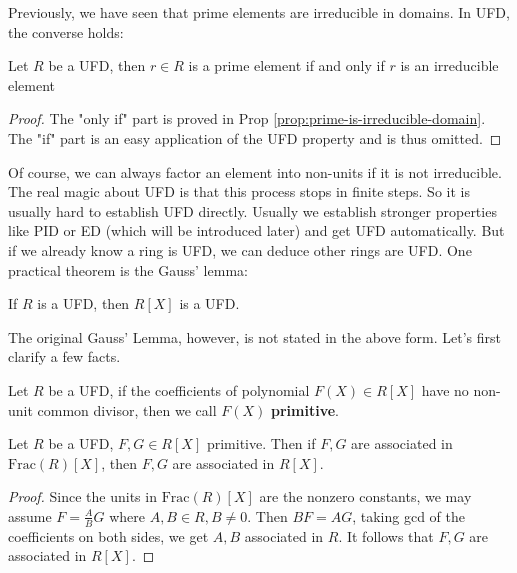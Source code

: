 \documentclass{note-eng}
\begin{document}
Previously, we have seen that prime elements are irreducible in domains. In UFD, the converse holds:

\begin{proposition} \label{prop:irreduible-is-prime-UFD}
    Let $R$ be a UFD, then $r \in R$ is a prime element if and only if $r$ is an irreducible element
\end{proposition}

\begin{proof}
    The "only if" part is proved in Prop \ref{prop:prime-is-irreducible-domain}. The "if" part is an easy application of the UFD property and is thus omitted.
\end{proof}

Of course, we can always factor an element into non-units if it is not irreducible. The real magic about UFD is that this process stops in finite steps. So it is usually hard to establish UFD directly. Usually we establish stronger properties like PID or ED (which will be introduced later) and get UFD automatically. But if we already know a ring is UFD, we can deduce other rings are UFD. One practical theorem is the Gauss' lemma:

\begin{theorem}
    If $R$ is a UFD, then $R[X]$ is a UFD.
\end{theorem}

The original Gauss' Lemma, however, is not stated in the above form. Let's first clarify a few facts.

\begin{definition}
    Let $R$ be a UFD, if the coefficients of polynomial $F(X) \in R[X]$ have no non-unit common divisor, then we call $F(X)$ \textbf{primitive}.
\end{definition}

\begin{lemma}\label{lem:gauss-associated}
    Let $R$ be a UFD, $F, G \in R[X]$ primitive. Then if $F, G$ are associated in $\mathrm{Frac}(R)[X]$, then $F, G$ are associated in $R[X]$.
\end{lemma}

\begin{proof}
    Since the units in $\mathrm{Frac}(R)[X]$ are the nonzero constants, we may assume $F = \frac{A}{B} G$ where $A, B \in R, B \ne 0$. Then $BF = AG$, taking gcd of the coefficients on both sides, we get $A, B$ associated in $R$. It follows that $F, G$ are associated in $R[X]$.
\end{proof}
\end{document}
